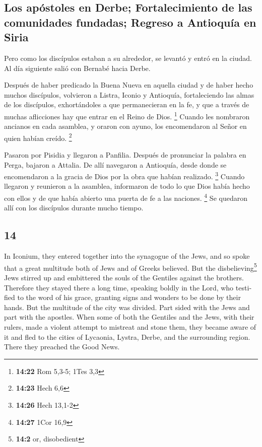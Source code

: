 \begin{paracol}{2}
\hypertarget{los-apuxf3stoles-en-derbe-fortalecimiento-de-las-comunidades-fundadas-regreso-a-antioquuxeda-en-siria}{%
\subsection{Los apóstoles en Derbe; Fortalecimiento de las comunidades
fundadas; Regreso a Antioquía en
Siria}\label{los-apuxf3stoles-en-derbe-fortalecimiento-de-las-comunidades-fundadas-regreso-a-antioquuxeda-en-siria}}

 Pero como los discípulos estaban a su alrededor, se
levantó y entró en la ciudad. Al día siguiente salió con Bernabé hacia
Derbe.

 Después de haber predicado la Buena Nueva en aquella
ciudad y de haber hecho muchos discípulos, volvieron a Listra, Iconio y
Antioquía,  fortaleciendo las almas de los discípulos,
exhortándoles a que permanecieran en la fe, y que a través de muchas
aflicciones hay que entrar en el Reino de Dios. \footnote{\textbf{14:22}
  Rom 5,3-5; 1Tes 3,3}  Cuando les nombraron ancianos en
cada asamblea, y oraron con ayuno, los encomendaron al Señor en quien
habían creído. \footnote{\textbf{14:23} Hech 6,6}

 Pasaron por Pisidia y llegaron a Panfilia.
 Después de pronunciar la palabra en Perga, bajaron a
Attalia.  De allí navegaron a Antioquía, desde donde se
encomendaron a la gracia de Dios por la obra que habían realizado.
\footnote{\textbf{14:26} Hech 13,1-2}  Cuando llegaron y
reunieron a la asamblea, informaron de todo lo que Dios había hecho con
ellos y de que había abierto una puerta de fe a las naciones.
\footnote{\textbf{14:27} 1Cor 16,9}  Se quedaron allí con
los discípulos durante mucho tiempo.

\switchcolumn
\begin{otherlanguage}{english}

\hypertarget{section-27}{%
\section{14}\label{section-27}}

 In Iconium, they entered together into the synagogue of
the Jews, and so spoke that a great multitude both of Jews and of Greeks
believed.  But the disbelieving\footnote{\textbf{14:2} or,
  disobedient} Jews stirred up and embittered the souls of the Gentiles
against the brothers.  Therefore they stayed there a long
time, speaking boldly in the Lord, who testified to the word of his
grace, granting signs and wonders to be done by their hands.
 But the multitude of the city was divided. Part sided
with the Jews and part with the apostles.  When some of
both the Gentiles and the Jews, with their rulers, made a violent
attempt to mistreat and stone them,  they became aware of
it and fled to the cities of Lycaonia, Lystra, Derbe, and the
surrounding region.  There they preached the Good News.


\end{otherlanguage}
\end{paracol}
